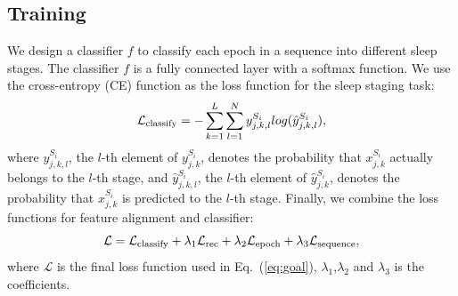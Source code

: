 \documentclass[letterpaper]{article} %
\begin{document}
	\subsection{Training}
	
	
	We design a classifier $f$ to classify each epoch in a sequence into different sleep stages. The classifier $f$ is a fully connected layer with a softmax function.
	We use the cross-entropy (CE) function as the loss function for the sleep staging task:
	\begin{equation}
		\label{eq:classify}
		\small
		\mathcal L_{\mathrm{classify}} =-\sum^{L}_{k=1} \sum^{N}_{l=1} y^{S_i}_{j, k, l}log(\hat{y}^{S_i}_{j, k, l}),
	\end{equation}
	where $y^{S_i}_{j, k, l}$, the $l$-th element of $y^{S_i}_{j, k}$, denotes the probability that $x^{S_i}_{j, k}$ actually belongs to the $l$-th stage, and $\hat{y}^{S_i}_{j, k, l}$, the $l$-th element of $\hat{y}^{S_i}_{j, k}$, denotes the probability that $x^{S_i}_{j, k}$ is predicted to the $l$-th stage.
	Finally, we combine the loss functions for feature alignment and classifier:
	\begin{equation}
		\label{eq:loss}
		\small
		\mathcal L = \mathcal L_{\mathrm{classify}} + \lambda_1 \mathcal{L}_{\mathrm{rec}} + \lambda_2 \mathcal{L}_{\mathrm{epoch}} + \lambda_3 \mathcal{L}_{\mathrm{sequence}},
	\end{equation}
	where $\mathcal L$ is the final loss function used in Eq.~(\ref{eq:goal}), $\lambda_1$,$\lambda_2$ and $\lambda_3$ is the coefficients.
	
\end{document}
